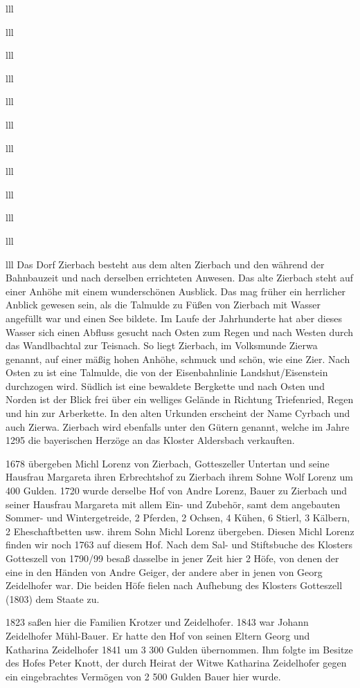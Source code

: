 \documentclass[12pt,a4pager]{book}
\begin{document}
\begin{tabuluar}{lll}
\begin{tabuluar}{lll}
\begin{tabuluar}{lll}
\begin{tabuluar}{lll}
\begin{tabuluar}{lll}
\begin{tabuluar}{lll}
\begin{tabuluar}{lll}
\begin{tabuluar}{lll}
\begin{tabuluar}{lll}
\begin{tabuluar}{lll}
\begin{tabuluar}{lll}
\begin{tabuluar}{lll}
Das Dorf Zierbach besteht aus dem alten Zierbach und den während der Bahnbauzeit
und nach derselben errichteten Anwesen. Das alte Zierbach steht auf einer Anhöhe
mit einem wunderschönen Ausblick. Das mag früher ein herrlicher Anblick gewesen
sein, als die Talmulde zu Füßen von Zierbach mit Wasser angefüllt war und einen
See bildete. Im Laufe der Jahrhunderte hat aber dieses Wasser sich einen Abfluss
gesucht nach Osten zum Regen und nach Westen durch das Wandlbachtal zur
Teisnach. So liegt Zierbach, im Volksmunde Zierwa genannt, auf einer mäßig hohen
Anhöhe, schmuck und schön, wie eine Zier. Nach Osten zu ist eine Talmulde, die
von der Eisenbahnlinie Landshut/Eisenstein durchzogen wird. Südlich ist eine
bewaldete Bergkette und nach Osten und Norden ist der Blick frei über ein
welliges Gelände in Richtung Triefenried, Regen und hin zur Arberkette. In den
alten Urkunden erscheint der Name Cyrbach und auch Zierwa. Zierbach wird
ebenfalls unter den Gütern genannt, welche im Jahre 1295 die bayerischen Herzöge
an das Kloster Aldersbach verkauften.

1678 übergeben Michl Lorenz von Zierbach, Gotteszeller Untertan und seine
Hausfrau Margareta ihren Erbrechtshof zu Zierbach ihrem Sohne Wolf Lorenz um 400
Gulden. 1720 wurde derselbe Hof von Andre Lorenz, Bauer zu Zierbach und seiner
Hausfrau Margareta mit allem Ein- und Zubehör, samt dem angebauten Sommer- und
Wintergetreide, 2 Pferden, 2 Ochsen, 4 Kühen, 6 Stierl, 3 Kälbern, 2
Eheschaftbetten usw. ihrem Sohn Michl Lorenz übergeben. Diesen Michl Lorenz
finden wir noch 1763 auf diesem Hof. Nach dem Sal- und Stiftsbuche des Klosters
Gotteszell von 1790/99 besaß dasselbe in jener Zeit hier 2 Höfe, von denen der
eine in den Händen von Andre Geiger, der andere aber in jenen von Georg
Zeidelhofer war. Die beiden Höfe fielen nach Aufhebung des Klosters Gotteszell
(1803) dem Staate zu.

1823 saßen hier die Familien Krotzer und Zeidelhofer. 1843 war Johann
Zeidelhofer Mühl-Bauer. Er hatte den Hof von seinen Eltern Georg und Katharina
Zeidelhofer 1841 um 3 300 Gulden übernommen. Ihm folgte im Besitze des Hofes
Peter Knott, der durch Heirat der Witwe Katharina Zeidelhofer gegen ein
eingebrachtes Vermögen von 2 500 Gulden Bauer hier wurde.


\end{tabuluar}
\end{tabuluar}
\end{tabuluar}
\end{tabuluar}
\end{tabuluar}
\end{tabuluar}
\end{tabuluar}
\end{tabuluar}
\end{tabuluar}
\end{tabuluar}
\end{tabuluar}
\end{tabuluar}
\end{document}
